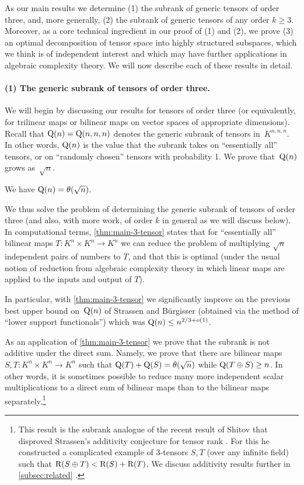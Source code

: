 \documentclass[10pt,a4paper]{article}
\theoremstyle{definition}
\theoremstyle{remark}
\newcommand{\trk}{{\rm R}}
\newcommand{\subrank}{{\rm Q}}
\newcommand{\gensubrank}{{\rm Q}}
\begin{document}
As our main results we determine (1) the subrank of generic tensors of order three, 
and, more generally, (2) the subrank of generic tensors of any order $k \geq 3$. 
Moreover, as a core technical ingredient in our proof of (1) and (2), we prove (3) an optimal decomposition of tensor space into highly structured subspaces, which we think is of independent interest and which may have further applications in algebraic complexity theory. We will now describe each of these results in detail.

\paragraph{(1) The generic subrank of tensors of order three.}
We will begin by discussing our results for tensors of order three (or equivalently, for trilinear maps 
or bilinear maps on vector spaces of appropriate dimensions). 
Recall that $\gensubrank(n) = \gensubrank(n,n,n)$ denotes the generic subrank of tensors in~$K^{n,n,n}$. In other words, $\gensubrank(n)$ is the value that the subrank takes on ``essentially all'' tensors, or on ``randomly chosen'' tensors with probability 1. We prove that~$\gensubrank(n)$ grows as~$\sqrt{n}$.


\begin{theorem}\label{thm:main-3-tensor}
We have $\gensubrank(n) = \theta(\sqrt{n})$.
\end{theorem}


We thus solve the problem of determining the generic subrank of tensors of order three (and also, with more work, of order $k$ in general as we will discuss below).
In computational terms, \autoref{thm:main-3-tensor} states that for ``essentially all'' bilinear maps $T : K^n \times K^n \to K^n$ we can reduce the problem of multiplying $\sqrt{n}$ independent pairs of numbers  to $T$, and that this is optimal (under the usual notion of reduction from algebraic complexity theory in which linear maps are applied to the inputs and output of $T$). 

In particular, with \autoref{thm:main-3-tensor} we significantly improve on the previous best upper bound on~$\gensubrank(n)$ of Strassen and Bürgisser (obtained via the method of ``lower support functionals'') which was $\gensubrank(n) \leq n^{2/3 + o(1)}$.

As an application of \autoref{thm:main-3-tensor} we prove that the subrank is not additive under the direct sum. Namely, we prove that there are bilinear maps $S,T : K^n \times K^n \to K^n$ such that $\subrank(T) + \subrank(S) = \theta(\sqrt{n})$ while $\subrank(T \oplus S) \geq n$. In other words, it is sometimes possible to reduce many more independent scalar multiplications to a direct sum of bilinear maps than to the bilinear maps separately.\footnote{This result is the subrank analogue of the recent result of Shitov \cite{MR3974478} that disproved Strassen's additivity conjecture for tensor rank \cite{MR521168}. For this he constructed a complicated example of 3-tensors $S,T$ (over any infinite field) such that $\trk(S \oplus T) < \trk(S) + \trk(T)$. We discuss additivity results further in \autoref{subsec:related}
.}
%
\end{document}
